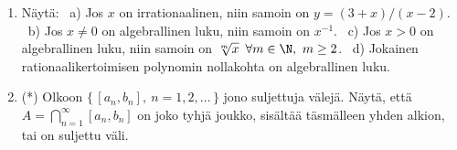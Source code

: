 \begin{enumerate}
\item
Näytä: \ a) Jos $x$ on irrationaalinen, niin samoin on $y=(3+x)/(x-2)$. \
b) Jos $x \neq 0$ on algebrallinen luku, niin samoin on $x^{-1}$. \ c) Jos $x>0$ on
algebrallinen luku, niin samoin on $\sqrt[m]{x}\,\ \forall m\in\N,\ m \ge 2$. \
d) Jokainen rationaalikertoimisen polynomin nollakohta on algebrallinen luku.

\item (*)
Olkoon $\{\,[a_n,b_n],\ n=1,2,\ldots\,\}$ jono suljettuja välejä. Näytä, että 
$A=\bigcap_{n=1}^\infty [a_n,b_n]$ on joko tyhjä joukko, sisältää täsmälleen yhden alkion, tai
on suljettu väli.

\end{enumerate}